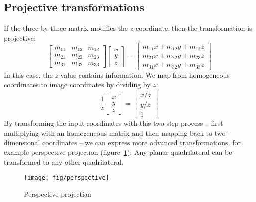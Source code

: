 \documentclass[english,12pt]{ifimaster}
\begin{document}
\subsection{Projective transformations}

If the three-by-three matrix modifies the $z$ coordinate, then the
transformation is projective:
\begin{equation}
  \left[\begin{matrix}
      m_{11} & m_{12} & m_{13}\\
      m_{21} & m_{22} & m_{23}\\
      m_{31} & m_{32} & m_{33}
    \end{matrix}\right]
  \left[\begin{matrix}
      x\\
      y\\
      z
    \end{matrix}\right]
  = \left[\begin{matrix}
      m_{11}x + m_{12}y + m_{13}z\\
      m_{21}x + m_{22}y + m_{23}z\\
      m_{31}x + m_{32}y + m_{33}z
    \end{matrix}\right]
\end{equation}
In this case, the $z$ value contains information. We map from
homogeneous coordinates to image coordinates by dividing by $z$:
\begin{equation}
  \frac{1}{z}
  \left[\begin{matrix}
      x\\
      y\\
      z
    \end{matrix}\right]
  =
  \left[\begin{matrix}
      x/z\\
      y/z\\
      1
    \end{matrix}\right]
\end{equation}
By transforming the input coordinates with this two-step process --
first multiplying with an homogeneous matrix and then mapping back to
two-dimensional coordinates -- we can express more advanced
transformations, for example perspective projection
(figure~\ref{fig:perspective}). Any planar quadrilateral can be
transformed to any other quadrilateral.

\begin{figure}[b]
  \centering
  \texttt{[image: fig/perspective]}
  \caption{Perspective projection}
  \label{fig:perspective}
\end{figure}
\end{document}
